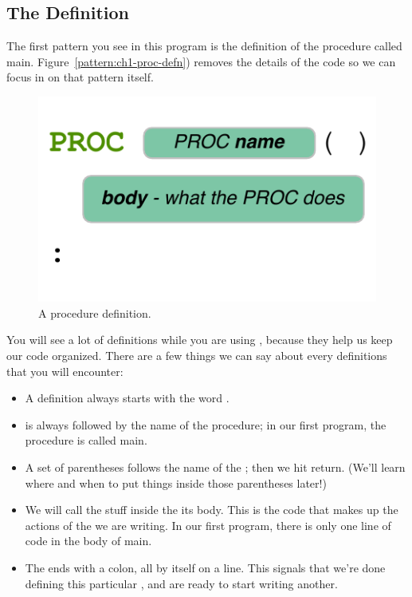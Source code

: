\subsection{The \PROCedure Definition}
The first pattern you see in this program is the definition of the procedure called {\code main}. Figure~\vref{pattern:ch1-proc-defn}) removes the details of the code so we can focus in on that pattern itself.

\begin{figure}[ht]
  \begin{center}
    \includegraphics[scale=1.0]{images/ch1-proc-defn-pattern}
    \caption{A procedure definition.}
    \label{pattern:ch1-proc-defn}
  \end{center}
\end{figure}
        
\newpage

You will see a lot of \PROCedure definitions while you are using \plumbing, because they help us keep our code organized. There are a few things we can say about every \PROC definitions that you will encounter:

\begin{itemize}
	\item A \PROCedure definition always starts with the word \PROC. 
	\item \PROC is always followed by the name of the procedure; in our first program, the procedure is called {\code main}. 
	\item A set of parentheses follows the name of the \PROC; then we hit return. (We'll learn where and when to put things inside those parentheses later!) 
	\item We will call the stuff inside the \PROCedure its {\strong body}. This is the code that makes up the actions of the \PROC we are writing. In our first program, there is only one line of code in the body of {\code main}.
	\item The \PROC ends with a colon, all by itself on a line. This signals that we're done defining this particular \PROC, and are ready to start writing another.
\end{itemize}

